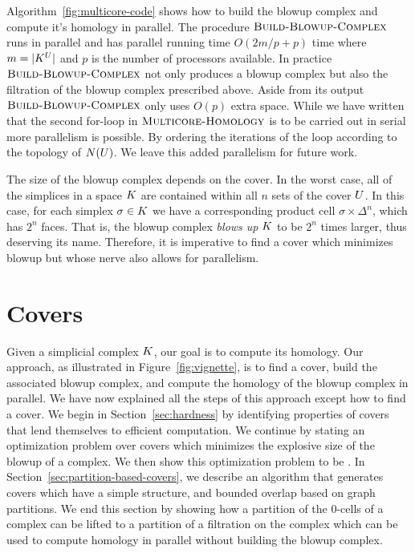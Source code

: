 \documentclass{jocg}
\begin{document}
Algorithm~\ref{fig:multicore-code} shows how to build the blowup complex and compute it's homology in parallel. The procedure $\textnormal{\scshape Build-Blowup-Complex}$ runs in parallel and has parallel running time $O(2m/p + p)$ time where $m = |K^{U}|$ and $p$ is the number of processors available. In practice $\textnormal{\scshape Build-Blowup-Complex}$ not only produces a blowup complex but also the filtration of the blowup complex prescribed above. Aside from its output $\textnormal{\scshape Build-Blowup-Complex}$ only uses $O(p)$ extra space. While we have written that the second for-loop in $\textnormal{\scshape Multicore-Homology}$ is to be carried out in serial more parallelism is possible. By ordering the iterations of the loop according to the topology of $N(U)$. We leave this added parallelism for future work.
 
The size of the blowup complex depends on the cover. In the worst case, all of 
the simplices in a space $K$ are contained within all $n$ sets of the cover 
$U$. In this case, for each simplex $\sigma \in K$ we have a corresponding 
product cell $\sigma \times \Delta^n$, which has $2^n$ faces. That is, the 
blowup complex \emph{blows up} $K$ to be $2^n$ times larger, thus deserving 
its name. Therefore, it is imperative to find a cover which minimizes blowup but whose
nerve also allows for parallelism. 

\section{Covers}
\label{sec:covers}
Given a simplicial complex $K$, our goal is to compute its homology.  
Our approach, as illustrated in Figure~\ref{fig:vignette}, is to find a cover, 
build the associated blowup complex, and compute the homology of the blowup complex in 
parallel. We have now explained all the steps of this approach except how to find a cover. 
We begin in Section~\ref{sec:hardness} by identifying 
properties of covers that lend themselves to efficient computation.
We continue by stating an optimization problem over covers which 
minimizes the explosive size of the blowup of a complex. We then show this optimization problem to be \NPH{}.  
In Section~\ref{sec:partition-based-covers}, we describe an algorithm 
that generates covers which have a simple structure, and bounded overlap 
based on graph partitions. We end this section by showing how a partition of the 
0-cells of a complex can be lifted to a partition of a filtration on the complex 
which can be used to compute homology in parallel without building the blowup complex.
\end{document}
